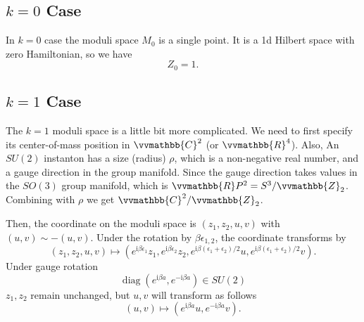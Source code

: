 \documentclass{article}
\begin{document}
\subsection{$k=0$ Case}
In $k=0$ case the moduli space $M_0$ is a single point. It is a 1d Hilbert space with zero Hamiltonian, so we have 
\begin{equation}
    Z_0=1.
\end{equation}

\subsection{$k=1$ Case}
The $k=1$ moduli space is a little bit more complicated. We need to first specify its center-of-mass position in $\vvmathbb{C}^2$ (or $\vvmathbb{R}^4$). Also, An $SU(2)$ instanton has a size (radius) $\rho$, which is a non-negative real number, and a gauge direction in the group manifold. Since the gauge direction takes values in the $SO(3)$ group manifold, which is $\vvmathbb{R}P^2=S^3/\vvmathbb{Z}_2$. Combining with $\rho$ we get $\vvmathbb{C}^2/\vvmathbb{Z}_2$.

Then, the coordinate on the moduli space is $(z_1,z_2,u,v)$ with $(u,v)\sim-(u,v)$. Under the rotation by $\beta\epsilon_{1,2}$, the coordinate transforms by
\begin{equation}
\left(z_{1}, z_{2}, u, v\right) \mapsto\left(e^{\mathrm{i} \beta \epsilon_{1}} z_{1}, e^{\mathrm{i} \beta \epsilon_{2}} z_{2}, e^{\mathrm{i} \beta\left(\epsilon_{1}+\epsilon_{2}\right) / 2} u, e^{\mathrm{i} \beta\left(\epsilon_{1}+\epsilon_{2}\right) / 2} v\right).
\end{equation}
Under gauge rotation 
\begin{equation}
\operatorname{diag}\left(e^{\mathrm{i} \beta a}, e^{-\mathrm{i} \beta a}\right) \in SU(2)
\end{equation}
$z_1,z_2$ remain unchanged, but $u,v$ will transform as follows
\begin{equation}
(u, v) \mapsto\left(e^{\mathrm{i} \beta a} u, e^{-\mathrm{i} \beta a} v\right).
\end{equation}
\end{document}
